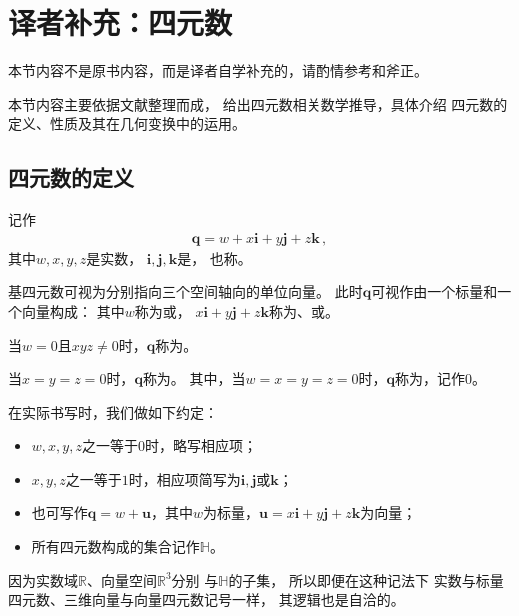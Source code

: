 \section{译者补充：四元数}\label{sec:译者补充：四元数}
\begin{remark}
    本节内容不是原书内容，而是译者自学补充的，请酌情参考和斧正。
\end{remark}

本节内容主要依据文献\citep{10.5555/90767.90913,enwiki:1013104981}整理而成，
给出四元数相关数学推导，具体介绍
四元数的定义、性质及其在几何变换中的运用。

\subsection{四元数的定义}\label{sub:四元数的定义}
\begin{definition}
    记作
    \begin{align}
        {\bm q}=w+x\mathbf{i}+y\mathbf{j}+z\mathbf{k}\, ,
    \end{align}
    其中$w, x, y, z$是实数，
    $\mathbf{i}, \mathbf{j}, \mathbf{k}$是，
    也称。

    基四元数可视为分别指向三个空间轴向的单位向量。
    此时${\bm q}$可视作由一个标量和一个向量构成：
    其中$w$称为或，
    $x\mathbf{i}+y\mathbf{j}+z\mathbf{k}$称为、或。
\end{definition}
\begin{definition}
    当$w=0$且$xyz\neq 0$时，${\bm q}$称为。
\end{definition}
\begin{definition}
    当$x=y=z=0$时，${\bm q}$称为。
    其中，当$w=x=y=z=0$时，${\bm q}$称为，记作$0$。
\end{definition}
\begin{notation}
    在实际书写时，我们做如下约定：
    \begin{itemize}
        \item $w, x, y, z$之一等于$0$时，略写相应项；
        \item $x, y, z$之一等于$1$时，相应项简写为$\mathbf{i, j}$或$\mathbf{k}$；
        \item 也可写作${\bm q}=w+{\bm u}$，其中$w$为标量，${\bm u}=x\mathbf{i}+y\mathbf{j}+z\mathbf{k}$为向量；
        \item 所有四元数构成的集合记作$\mathbb{H}$。
    \end{itemize}
\end{notation}
\begin{remark}
    因为实数域$\mathbb{R}$、向量空间$\mathbb{R}^3$分别
    与$\mathbb{H}$的子集，
    所以即便在这种记法下
    实数与标量四元数、三维向量与向量四元数记号一样，
    其逻辑也是自洽的。
\end{remark}
